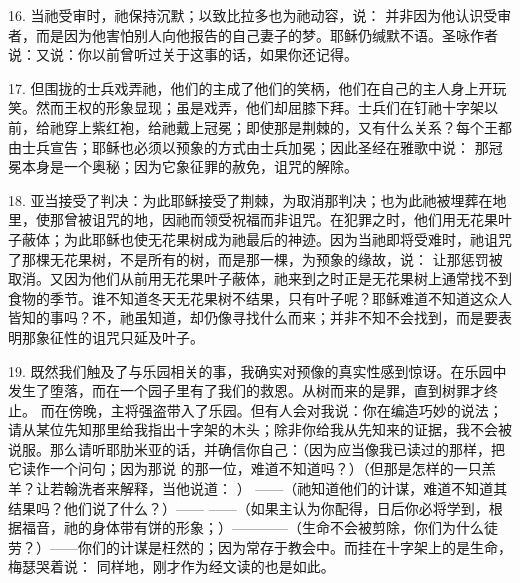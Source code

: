 16. 当祂受审时，祂保持沉默；以致比拉多也为祂动容，说： 并非因为他认识受审者，而是因为他害怕别人向他报告的自己妻子的梦。耶稣仍缄默不语。圣咏作者说：又说：你以前曾听过关于这事的话，如果你还记得。\par

17. 但围拢的士兵戏弄祂，他们的主成了他们的笑柄，他们在自己的主人身上开玩笑。然而王权的形象显现；虽是戏弄，他们却屈膝下拜。士兵们在钉祂十字架以前，给祂穿上紫红袍，给祂戴上冠冕；即使那是荆棘的，又有什么关系？每个王都由士兵宣告；耶稣也必须以预象的方式由士兵加冕；因此圣经在雅歌中说： 那冠冕本身是一个奥秘；因为它象征罪的赦免，诅咒的解除。\par

18. 亚当接受了判决：为此耶稣接受了荆棘，为取消那判决；也为此祂被埋葬在地里，使那曾被诅咒的地，因祂而领受祝福而非诅咒。在犯罪之时，他们用无花果叶子蔽体；为此耶稣也使无花果树成为祂最后的神迹。因为当祂即将受难时，祂诅咒了那棵无花果树，不是所有的树，而是那一棵，为预象的缘故，说： 让那惩罚被取消。又因为他们从前用无花果叶子蔽体，祂来到之时正是无花果树上通常找不到食物的季节。谁不知道冬天无花果树不结果，只有叶子呢？耶稣难道不知道这众人皆知的事吗？不，祂虽知道，却仍像寻找什么而来；并非不知不会找到，而是要表明那象征性的诅咒只延及叶子。\par

19. 既然我们触及了与乐园相关的事，我确实对预像的真实性感到惊讶。在乐园中发生了堕落，而在一个园子里有了我们的救恩。从树而来的是罪，直到树罪才终止。  而在傍晚，主将强盗带入了乐园。但有人会对我说：你在编造巧妙的说法；请从某位先知那里给我指出十字架的木头；除非你给我从先知来的证据，我不会被说服。那么请听耶肋米亚的话，并确信你自己：（因为应当像我已读过的那样，把它读作一个问句；因为那说  的那一位，难道不知道吗？）（但那是怎样的一只羔羊？让若翰洗者来解释，当他说道：  ）  ——（祂知道他们的计谋，难道不知道其结果吗？他们说了什么？）—— ——（如果主认为你配得，日后你必将学到，根据福音，祂的身体带有饼的形象；）————（生命不会被剪除，你们为什么徒劳？）——你们的计谋是枉然的；因为常存于教会中。而挂在十字架上的是生命，梅瑟哭着说：  同样地，刚才作为经文读的也是如此。\par

